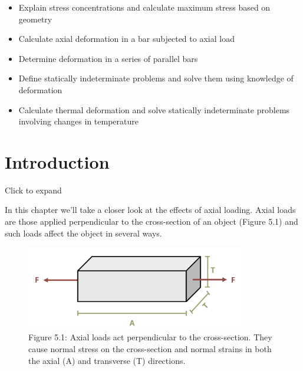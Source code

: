 \documentclass[
  letterpaper,
  DIV=11,
  numbers=noendperiod]{scrreprt}
\providecommand{\tightlist}{%
  \setlength{\itemsep}{0pt}\setlength{\parskip}{0pt}}\usepackage{longtable,booktabs,array}
\begin{document}
\begin{tcolorbox}[enhanced jigsaw, breakable, opacityback=0, toptitle=1mm, left=2mm, colback=white, opacitybacktitle=0.6, colframe=quarto-callout-note-color-frame, titlerule=0mm, arc=.35mm, leftrule=.75mm, bottomtitle=1mm, colbacktitle=quarto-callout-note-color!10!white, rightrule=.15mm, title={Learning Objectives}, bottomrule=.15mm, toprule=.15mm, coltitle=black]

\begin{itemize}
\tightlist
\item
  Explain stress concentrations and calculate maximum stress based on
  geometry
\item
  Calculate axial deformation in a bar subjected to axial load
\item
  Determine deformation in a series of parallel bars
\item
  Define statically indeterminate problems and solve them using
  knowledge of deformation
\item
  Calculate thermal deformation and solve statically indeterminate
  problems involving changes in temperature
\end{itemize}

\end{tcolorbox}

\section*{Introduction}\label{introduction-5}


Click to expand

In this chapter we'll take a closer look at the effects of axial
loading. Axial loads are those applied perpendicular to the
cross-section of an object (Figure 5.1) and such loads affect the object
in several ways.

\begin{figure}[H]

{\centering \includegraphics[width=3.76042in,height=\textheight]{images/PNGs/Figure 5.1.png}

}

\caption{Figure 5.1: Axial loads act perpendicular to the cross-section.
They cause normal stress on the cross-section and normal strains in both
the axial (A) and transverse (T) directions.}

\end{figure}%
\end{document}
